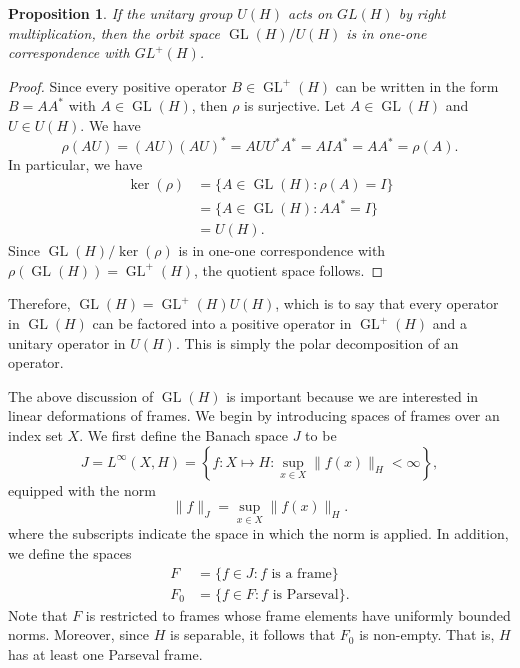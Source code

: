 \documentclass{article}
\newtheorem{prop}[defn]{Proposition}
\newcommand{\GL}{\operatorname{GL}}
\begin{document}
\begin{prop}
If the unitary group $U(H)$ acts on $GL(H)$ by right multiplication, then the orbit space $\GL(H)/U(H)$ is in one-one correspondence with $GL^+(H)$.
\end{prop}
\begin{proof}
Since every positive operator $B\in\GL^+(H)$ can be written in the form $B=AA^*$ with $A\in\GL(H)$, then $\rho$ is surjective. Let $A\in\GL(H)$ and $U\in U(H)$. We have
\[ \rho(AU) = (AU)(AU)^*
= AUU^*A^*
= AIA^*
= AA^*
= \rho(A). \]
In particular, we have
\begin{align*}
\ker(\rho) &= \{A\in\GL(H): \rho(A)=I\} \\
&= \{A\in\GL(H): AA^*=I\} \\
&= U(H).
\end{align*}
Since $\GL(H)/\ker(\rho)$ is in one-one correspondence with $\rho(\GL(H))=\GL^+(H)$, the quotient space follows.
\end{proof}

Therefore, $\GL(H) = \GL^+(H)U(H)$, which is to say that every operator in $\GL(H)$ can be factored into a positive operator in $\GL^+(H)$ and a unitary operator in $U(H)$. This is simply the polar decomposition of an operator.

The above discussion of $\GL(H)$ is important because we are interested in linear deformations of frames. We begin by introducing spaces of frames over an index set $X$.  We first define the Banach space $J$ to be
\begin{equation}
J = L^\infty(X, H)
= \left\{f:X\mapsto H: \sup_{x\in X} \|f(x)\|_H <\infty\right\},
\end{equation}
equipped with the norm
\[ \|f\|_J = \sup_{x\in X} \|f(x)\|_H. \]
where the subscripts indicate the space in which the norm is applied. In addition, we define the spaces
\begin{align}
F &= \{f\in J: f \mbox{ is a frame}\} \\
F_0 &= \{f\in F: f \mbox{ is Parseval}\}.
\end{align}
Note that $F$ is restricted to frames whose frame elements have uniformly bounded norms. Moreover, since $H$ is separable, it follows that $F_0$ is non-empty. That is, $H$ has at least one Parseval frame. 
\end{document}
